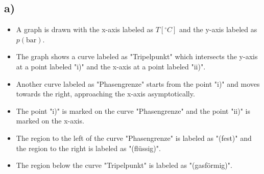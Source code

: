 

\subsection*{a)}
\begin{itemize}
    \item A graph is drawn with the x-axis labeled as $T [^\circ C]$ and the y-axis labeled as $p (\text{bar})$.
    \item The graph shows a curve labeled as "Tripelpunkt" which intersects the y-axis at a point labeled "i)" and the x-axis at a point labeled "ii)".
    \item Another curve labeled as "Phasengrenze" starts from the point "i)" and moves towards the right, approaching the x-axis asymptotically.
    \item The point "i)" is marked on the curve "Phasengrenze" and the point "ii)" is marked on the x-axis.
    \item The region to the left of the curve "Phasengrenze" is labeled as "(fest)" and the region to the right is labeled as "(flüssig)".
    \item The region below the curve "Tripelpunkt" is labeled as "(gasförmig)".
\end{itemize}